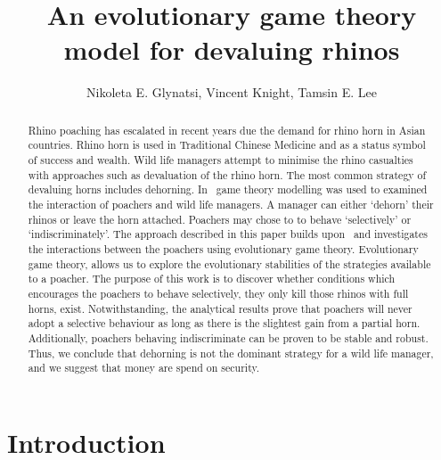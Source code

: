 \documentclass[10pt]{article}
\title{An evolutionary game theory model for devaluing rhinos}
\author{Nikoleta E. Glynatsi, Vincent Knight, Tamsin E. Lee} %
\date{}
\begin{document}
\maketitle

\begin{abstract}

Rhino poaching has escalated in recent years due the demand for rhino horn in 
Asian countries. Rhino horn is used in Traditional Chinese Medicine and as a 
status symbol of success and wealth. Wild life managers attempt to minimise
the rhino casualties with approaches such as devaluation of the rhino horn. 
The  most common strategy of devaluing horns includes dehorning. In~\cite{Lee}
game theory modelling was used to examined the interaction of poachers and
wild life managers.  A manager can either `dehorn' their rhinos or leave the
horn attached. Poachers may chose to to behave `selectively' or `indiscriminately'.
The approach described in this paper builds upon~\cite{Lee} and investigates 
the interactions  between the poachers using evolutionary game theory. 
Evolutionary game theory, allows us to explore the evolutionary stabilities 
of the strategies available to a poacher. The purpose of this work is to discover
whether conditions which encourages the poachers to behave selectively,
they only kill those rhinos with full horns, exist. Notwithstanding, the 
analytical results prove that poachers will never adopt a selective behaviour
as long as there is the slightest gain from a partial horn. Additionally, poachers
behaving indiscriminate can be proven to be stable and robust. Thus, we 
conclude that dehorning is not the dominant strategy for a wild life manager,
and we suggest that money are spend on security.

\end{abstract}

\section{Introduction}\label{section:introduction}
\end{document}
